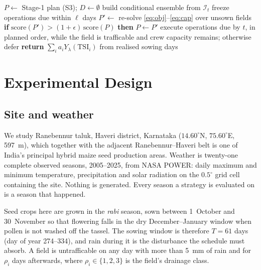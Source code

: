 \documentclass[10pt,twocolumn]{article}
\newcommand{\TSI}{\mathrm{TSI}}
\begin{document}
\begin{algorithm}[t]
\caption{Rolling-horizon execution}
\label{alg:roll}
\small
\begin{algorithmic}[1]
\STATE $P \leftarrow$ Stage-1 plan (S3); $D \leftarrow \emptyset$
    \STATE build conditional ensemble from $\mathcal{I}_t$ 
    \STATE freeze operations due within $\ell$ days
    \STATE $P' \leftarrow$ re-solve \eqref{eq:obj}--\eqref{eq:cap} over unsown fields
    \STATE \textbf{if} $\mathrm{score}(P') > (1+\epsilon)\,\mathrm{score}(P)$ \textbf{then} $P \leftarrow P'$
  \ENDIF
  \STATE execute operations due by $t$, in planned order, while the field is
         trafficable and crew capacity remains; otherwise defer
\ENDFOR
\STATE \textbf{return} $\sum_i a_i Y_\lambda(\TSI_i)$ from realised sowing days
\end{algorithmic}
\end{algorithm}

\section{Experimental Design}

\subsection{Site and weather}

We study Ranebennur taluk, Haveri district, Karnataka
($14.60^\circ$N, $75.60^\circ$E, 597~m), which together with the adjacent
Ranebennur--Haveri belt is one of India's principal hybrid maize seed
production areas. Weather is twenty-one complete observed seasons, 2005--2025,
from NASA POWER: daily maximum and minimum temperature, precipitation and
solar radiation on the $0.5^\circ$ grid cell containing the site. Nothing is
generated. Every season a strategy is evaluated on is a season that happened.

Seed crops here are grown in the \emph{rabi} season, sown between
1~October and 30~November so that flowering falls in the dry December--January
window when pollen is not washed off the tassel. The sowing window is
therefore $T = 61$ days (day of year 274--334), and rain during it is the
disturbance the schedule must absorb. A field is untrafficable on any day
with more than 5~mm of rain and for $\rho_i$ days afterwards, where
$\rho_i \in \{1,2,3\}$ is the field's drainage class.
\end{document}
